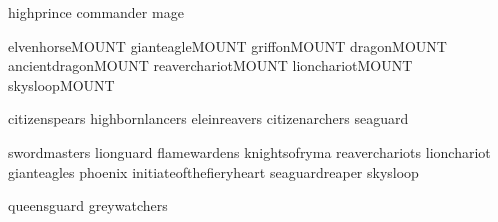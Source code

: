 

{highprince}
{commander}
{mage}

\clearpage
{}

{elvenhorseMOUNT}
{gianteagleMOUNT}
{griffonMOUNT}
{dragonMOUNT}
{ancientdragonMOUNT}
{reaverchariotMOUNT}
{lionchariotMOUNT}
{skysloopMOUNT}

\clearpage
{}

{citizenspears}
{highbornlancers}
{eleinreavers}
{citizenarchers}
{seaguard}

\clearpage
{}

{swordmasters}
{lionguard}
{flamewardens}
{knightsofryma}
{reaverchariots}
{lionchariot}
{gianteagles}
{phoenix}
{initiateofthefieryheart}
{seaguardreaper}
{skysloop}

\clearpage
{}

{queensguard}
{greywatchers}





